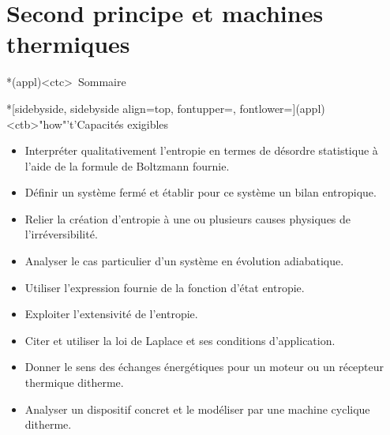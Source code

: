\documentclass[../../main/main.tex]{subfiles}
\begin{document}
\setcounter{chapter}{3}


\chapter{Second principe et machines thermiques}

\vspace*{\fill}

\begin{tcn}*(appl)<ctc>{\iconsomm~Sommaire}
	\let\item\olditem
	\vspace{-15pt}
	\minitoc
	\vspace{-25pt}
\end{tcn}

\begin{tcn}*[sidebyside, sidebyside align=top,
		fontupper=\small, fontlower=\small](appl)<ctb>"how"'t'{Capacités exigibles}
	\begin{itemize}[label=\rcheck]
		\item Interpréter qualitativement l'entropie en termes de désordre
		      statistique à l'aide de la formule de Boltzmann fournie.

		\item Définir un système fermé et établir pour ce système un bilan
		      entropique.

		\item Relier la création d'entropie à une ou plusieurs causes physiques de
		      l'irréversibilité.

		\item Analyser le cas particulier d'un système en évolution adiabatique.

		\item Utiliser l'expression fournie de la fonction d'état entropie.

		\item Exploiter l'extensivité de l'entropie.
	\end{itemize}
	\tcblower
	\begin{itemize}[label=\rcheck]
		\item Citer et utiliser la loi de Laplace et ses conditions
		      d'application.

		\item Donner le sens des échanges énergétiques pour un moteur ou un
		      récepteur thermique ditherme.

		\item Analyser un dispositif concret et le modéliser par une machine
		      cyclique ditherme.


\end{itemize}
\end{tcn}
\end{document}
